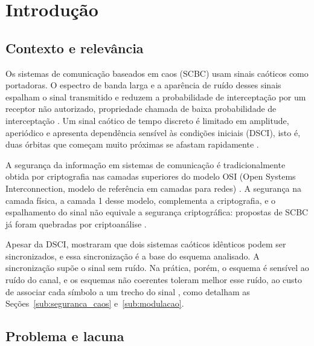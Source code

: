 \documentclass{pfccefsa}
\begin{document}

\section{Introdução}
\label{sec:introducao}

\subsection{Contexto e relevância}

Os sistemas de comunicação baseados em caos (SCBC) usam sinais caóticos como
portadoras. O espectro de banda larga e a aparência de ruído desses sinais
espalham o sinal transmitido e reduzem a probabilidade de interceptação por um
receptor não autorizado, propriedade chamada de baixa probabilidade de
interceptação \cite{Kaddoum2016,Baptista2021}. Um sinal caótico de tempo discreto é limitado
em amplitude, aperiódico e apresenta dependência sensível às condições iniciais
(DSCI), isto é, duas órbitas que começam muito próximas se afastam rapidamente
\cite{Alligood1996}.

A segurança da informação em sistemas de comunicação é tradicionalmente obtida
por criptografia nas camadas superiores do modelo OSI (Open Systems
Interconnection, modelo de referência em camadas para redes)
\cite{Tanenbaum2011}. A segurança na camada física, a camada 1 desse modelo,
complementa a criptografia, e o espalhamento do sinal não equivale a segurança
criptográfica: propostas de SCBC já foram quebradas por criptoanálise
\cite{Alvarez2003,AlvarezLi2006}.

Apesar da DSCI, \textcite{Pecora1990} mostraram que dois sistemas caóticos
idênticos podem ser sincronizados, e essa sincronização é a base do esquema
analisado. A sincronização supõe o sinal sem ruído. Na prática, porém, o esquema é
sensível ao ruído do canal, e os esquemas não coerentes toleram melhor esse ruído, ao
custo de associar cada símbolo a um trecho do sinal
\cite{Kaddoum2016}, como detalham as Seções~\ref{sub:seguranca_caos} e~\ref{sub:modulacao}.

\subsection{Problema e lacuna}
\end{document}
